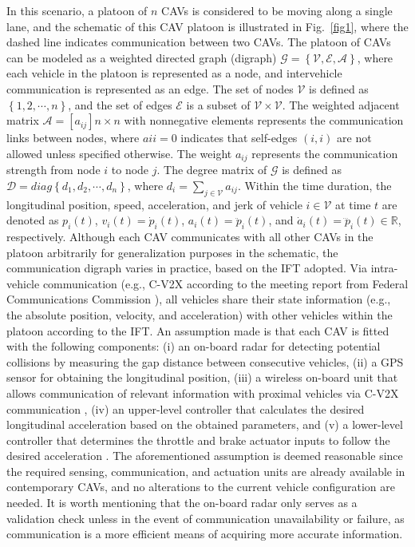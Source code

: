 \documentclass[a4paper]{cas-sc}
\begin{document}
In this scenario, a platoon of $n$ CAVs is considered to be moving along a single lane, and the schematic of this CAV platoon is illustrated in Fig.~\ref{fig1}, where the dashed line indicates communication between two CAVs. The platoon of CAVs can be modeled as a weighted directed graph (digraph) $\mathcal{G} = \left\{ {\mathcal{V},\mathcal{E},\mathcal{A}} \right\}$, where each vehicle in the platoon is represented as a node, and intervehicle communication is represented as an edge. The set of nodes $\mathcal{V}$ is defined as $\left\{ {1,2, \cdots ,n} \right\}$, and the set of edges $\mathcal{E}$ is a subset of $\mathcal{V} \times \mathcal{V}$. The weighted adjacent matrix $\mathcal{A} = {[{a_{ij}}]{n \times n}}$ with nonnegative elements represents the communication links between nodes, where ${a{ii}} = 0$ indicates that self-edges $\left( {i,i} \right)$ are not allowed unless specified otherwise. The weight ${a_{ij}}$ represents the communication strength from node $i$ to node $j$. The degree matrix of $\mathcal{G}$ is defined as $\mathcal{D} = diag\left\{ {{d_1},{d_2}, \cdots ,{d_n}} \right\}$, where ${d_i} = \sum\limits_{j \in \mathcal{V}} {{a_{ij}}}$. Within the time duration, the longitudinal position, speed, acceleration, and jerk of vehicle $i \in \mathcal{V}$ at time $t$ are denoted as $p_i\left(t\right)$, $v_i\left(t\right)={\dot{p}}_i\left(t\right)$, $a_i\left(t\right)={\ddot{p}}_i\left(t\right)$, and ${\dot{a}}_i\left(t\right)={\dddot{p}}_i\left(t\right) \in \mathbb{R}$, respectively. Although each CAV communicates with all other CAVs in the platoon arbitrarily for generalization purposes in the schematic, the communication digraph varies in practice, based on the IFT adopted. Via intra-vehicle communication (e.g., C-V2X according to the meeting report from Federal Communications Commission \citep{VerizonNorth2020}), all vehicles share their state information (e.g., the absolute position, velocity, and acceleration) with other vehicles within the platoon according to the IFT. An assumption made is that each CAV is fitted with the following components: (i) an on-board radar for detecting potential collisions by measuring the gap distance between consecutive vehicles, (ii) a GPS sensor for obtaining the longitudinal position, (iii) a wireless on-board unit that allows communication of relevant information with proximal vehicles via C-V2X communication \citep{VerizonNorth2020}, (iv) an upper-level controller that calculates the desired longitudinal acceleration based on the obtained parameters, and (v) a lower-level controller that determines the throttle and brake actuator inputs to follow the desired acceleration \citep{milanes2013cooperative}. The aforementioned assumption is deemed reasonable since the required sensing, communication, and actuation units are already available in contemporary CAVs, and no alterations to the current vehicle configuration are needed. It is worth mentioning that the on-board radar only serves as a validation check unless in the event of communication unavailability or failure, as communication is a more efficient means of acquiring more accurate information.
\end{document}
